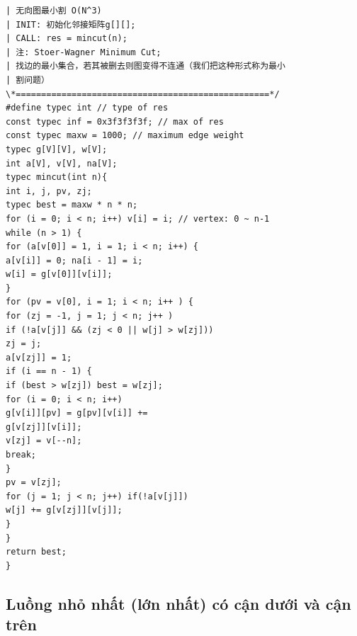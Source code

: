 \documentclass[11pt]{article}
\begin{document}
\begingroup
\scriptsize
\begin{verbatim}
| 无向图最小割 O(N^3)
| INIT: 初始化邻接矩阵g[][];
| CALL: res = mincut(n);
| 注: Stoer-Wagner Minimum Cut;
| 找边的最小集合，若其被删去则图变得不连通（我们把这种形式称为最小
| 割问题）
\*==================================================*/
#define typec int // type of res
const typec inf = 0x3f3f3f3f; // max of res
const typec maxw = 1000; // maximum edge weight
typec g[V][V], w[V];
int a[V], v[V], na[V];
typec mincut(int n){
int i, j, pv, zj;
typec best = maxw * n * n;
for (i = 0; i < n; i++) v[i] = i; // vertex: 0 ~ n-1
while (n > 1) {
for (a[v[0]] = 1, i = 1; i < n; i++) {
a[v[i]] = 0; na[i - 1] = i;
w[i] = g[v[0]][v[i]];
}
for (pv = v[0], i = 1; i < n; i++ ) {
for (zj = -1, j = 1; j < n; j++ )
if (!a[v[j]] && (zj < 0 || w[j] > w[zj]))
zj = j;
a[v[zj]] = 1;
if (i == n - 1) {
if (best > w[zj]) best = w[zj];
for (i = 0; i < n; i++)
g[v[i]][pv] = g[pv][v[i]] +=
g[v[zj]][v[i]];
v[zj] = v[--n];
break;
}
pv = v[zj];
for (j = 1; j < n; j++) if(!a[v[j]])
w[j] += g[v[zj]][v[j]];
}
}
return best;
}
\end{verbatim}
\endgroup

\subsection{Luồng nhỏ nhất (lớn nhất) có cận dưới và cận trên}
\end{document}
